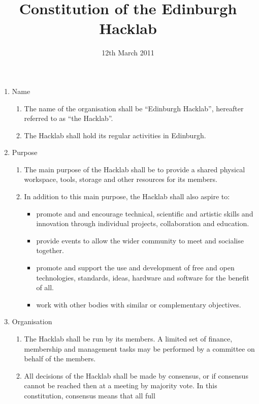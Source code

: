 \documentclass{article}
\title{Constitution of the Edinburgh Hacklab}
\date{12th March 2011}
\begin{document}
\maketitle
{}
\begin{enumerate}
  \item Name
    \begin{enumerate}
      \item The name of the organisation shall be ``Edinburgh
        Hacklab'', hereafter referred to as ``the Hacklab''.
      \item The Hacklab shall hold its regular activities in Edinburgh.
    \end{enumerate} %
  \item Purpose
    \begin{enumerate}
    \item The main purpose of the Hacklab shall be to provide a shared
      physical workspace, tools, storage and other resources for its
      members.
      \item In addition to this main purpose, the Hacklab shall also aspire to:
        \begin{itemize}
        \item promote and and encourage technical, scientific and
          artistic skills and innovation through individual projects,
          collaboration and education.
        \item provide events to allow the wider community to meet and
          socialise together. 
          \item promote and support the use and development of free
            and open technologies, standards, ideas, hardware and
            software for the benefit of all.
          \item work with other bodies with similar or complementary
            objectives.
        \end{itemize}
    \end{enumerate} %
  \item Organisation
    \begin{enumerate}
    \item The Hacklab shall be run by its members. A limited set of
      finance, membership and management tasks may be performed by a
      committee on behalf of the members.
    \item All decisions of the Hacklab shall be made by consensus, or
      if consensus cannot be reached then at a meeting by majority
      vote. In this constitution, consensus means that all full

\end{enumerate}
\end{enumerate}
\end{document}
